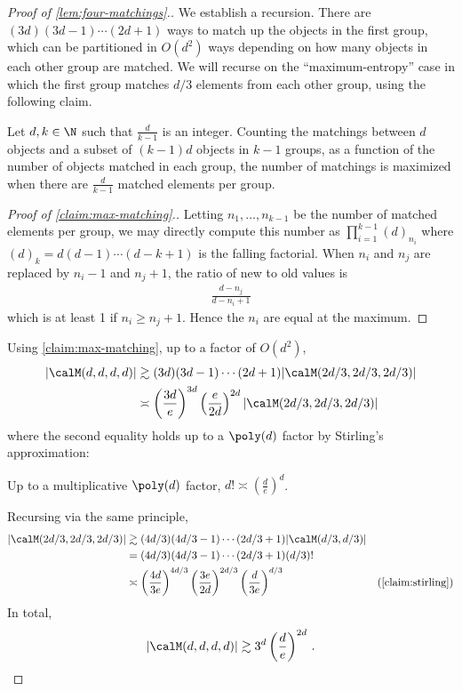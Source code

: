 \documentclass[12pt]{article}
\begin{document}
\begin{proof}[Proof of \cref{lem:four-matchings}.]
    We establish a recursion.
    There are $(3d)(3d-1)\cdots(2d+1)$ ways to match up the objects in the first group, which can be partitioned
    in $O(d^2)$ ways depending on how many objects in each other group are matched.
    We will recurse on the ``maximum-entropy'' case in which the
    first group matches 
    $d/3$ elements from each other group, using the following claim.
    \begin{claim}\label{claim:max-matching}
        Let $d,k \in \N$ such that $\frac{d}{k-1}$ is an integer.
        Counting the matchings between $d$ objects and a subset of $(k-1)d$ objects
        in $k-1$ groups,
        as a function of the number of objects matched in each group,
        the number of matchings is maximized when there are $\frac{d}{k-1}$
        matched elements per group.
    \end{claim}
    \begin{proof}[Proof of \cref{claim:max-matching}.]
        Letting $n_1, \dots, n_{k-1}$ be the number of matched elements per group, we may directly compute this number as
        $\prod_{i=1}^{k-1}(d)_{n_i}$
        where $(d)_k = d(d-1)\cdots (d-k+1)$ is the falling factorial.
        When $n_i$ and $n_j$ are replaced by $n_i - 1$ and $n_j + 1$, the ratio of new to old values is
        \begin{align*}
            \frac{d-n_j}{d - n_i + 1}
        \end{align*}
        which is at least 1 if $n_i \geq n_j + 1$. Hence the $n_i$ are equal at the maximum.
    \end{proof}

    Using \cref{claim:max-matching}, up to a factor of $O(d^2)$,
    \begin{align*}
    |\calM(d,d,d,d)| &\gtrsim (3d)(3d-1)\cdots (2d+1)|\calM(2d/3,2d/3,2d/3)|\\
    &\asymp \left(\frac{3d}{e}\right)^{3d} \left(\frac{e}{2d}\right)^{2d} |\calM(2d/3,2d/3,2d/3)|
    \end{align*}
    where the second equality holds up to a $\poly(d)$ factor
    by Stirling's approximation:
    \begin{fact}
    \label{claim:stirling}
        Up to a multiplicative $\poly(d)$ factor, $d! \asymp \left(\frac{d}{e}\right)^d$.
    \end{fact}
    Recursing via the same principle,
    \begin{align*}
    |\calM(2d/3,2d/3,2d/3)| &\gtrsim (4d/3)(4d/3-1)\cdots(2d/3+1)|\calM(d/3,d/3)|\\
    &= (4d/3)(4d/3-1)\cdots(2d/3+1)(d/3)!\\
    &\asymp \left(\frac{4d}{3e}\right)^{4d/3}\left(\frac{3e}{2d}\right)^{2d/3}\left(\frac{d}{3e}\right)^{d/3} & \text{(\cref{claim:stirling})}
    \end{align*}
    In total,
    \[|\calM(d,d,d,d)| \gtrsim 3^d \left(\frac{d}{e}\right)^{2d}\,.\qedhere\]
\end{proof}
 
\end{document}
